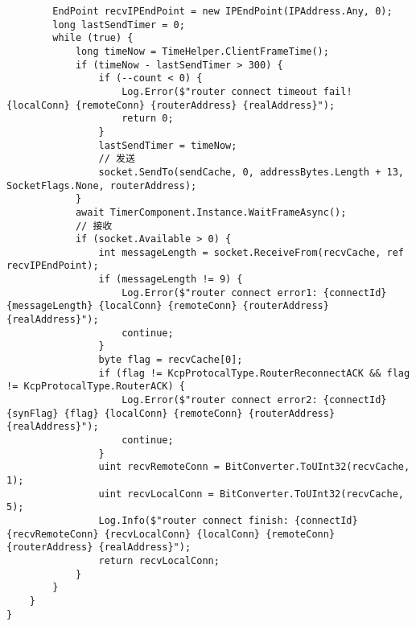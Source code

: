 \documentclass[9pt, b5paper]{article}
\begin{document}
\begin{verbatim}
        EndPoint recvIPEndPoint = new IPEndPoint(IPAddress.Any, 0);
        long lastSendTimer = 0;
        while (true) {
            long timeNow = TimeHelper.ClientFrameTime();
            if (timeNow - lastSendTimer > 300) {
                if (--count < 0) {
                    Log.Error($"router connect timeout fail! {localConn} {remoteConn} {routerAddress} {realAddress}");
                    return 0;
                }
                lastSendTimer = timeNow;
                // 发送
                socket.SendTo(sendCache, 0, addressBytes.Length + 13, SocketFlags.None, routerAddress);
            }
            await TimerComponent.Instance.WaitFrameAsync();
            // 接收
            if (socket.Available > 0) {
                int messageLength = socket.ReceiveFrom(recvCache, ref recvIPEndPoint);
                if (messageLength != 9) {
                    Log.Error($"router connect error1: {connectId} {messageLength} {localConn} {remoteConn} {routerAddress} {realAddress}");
                    continue;
                }
                byte flag = recvCache[0];
                if (flag != KcpProtocalType.RouterReconnectACK && flag != KcpProtocalType.RouterACK) {
                    Log.Error($"router connect error2: {connectId} {synFlag} {flag} {localConn} {remoteConn} {routerAddress} {realAddress}");
                    continue;
                }
                uint recvRemoteConn = BitConverter.ToUInt32(recvCache, 1);
                uint recvLocalConn = BitConverter.ToUInt32(recvCache, 5);
                Log.Info($"router connect finish: {connectId} {recvRemoteConn} {recvLocalConn} {localConn} {remoteConn} {routerAddress} {realAddress}");
                return recvLocalConn;
            }
        }
    }
}
\end{verbatim}
\end{document}
